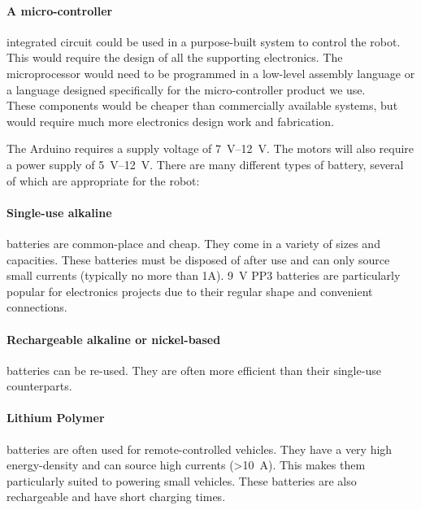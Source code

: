         \paragraph{A micro-controller} integrated circuit could be used in a purpose-built system to control the robot. This would require the design of all the supporting electronics. The microprocessor would need to be programmed in a low-level assembly language or a language designed specifically for the micro-controller product we use.\\
        These components would be cheaper than commercially available systems, but would require much more electronics design work and fabrication.

        \label{outline: power}
            The \gls{Arduino} requires a supply voltage of \SIrange{7}{12}{\volt}. The motors will also require a power supply of \SIrange{5}{12}{\volt}. There are many different types of battery, several of which are appropriate for the robot:

            \paragraph{Single-use alkaline} batteries are common-place and cheap. They come in a variety of sizes and capacities. These batteries must be disposed of after use and can only source small currents (typically no more than 1A). \SI{9}{\volt} PP3 batteries are particularly popular for electronics projects due to their regular shape and convenient connections.
            \paragraph{Rechargeable alkaline or nickel-based} batteries can be re-used. They are often more efficient than their single-use counterparts.
            \paragraph{Lithium Polymer} batteries are often used for remote-controlled vehicles. They have a very high energy-density and can source high currents (>\SI{10}{\ampere}). This makes them particularly suited to powering small vehicles. These batteries are also rechargeable and have short charging times.

